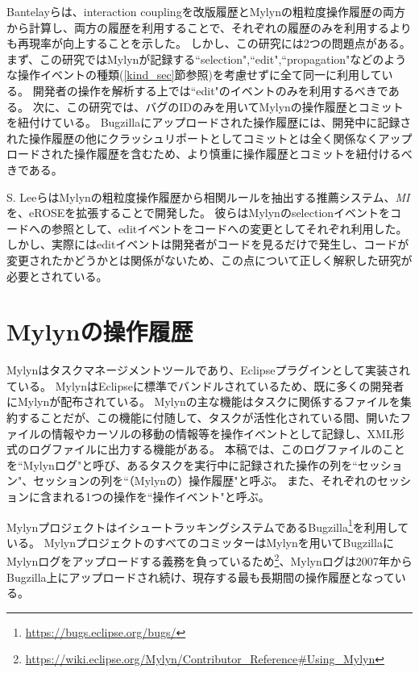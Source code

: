 \documentclass[a4paper]{jsbook}
\begin{document}
Bantelayら\cite{Bantelay:2013}は、interaction couplingを改版履歴とMylynの粗粒度操作履歴の両方から計算し、両方の履歴を利用することで、それぞれの履歴のみを利用するよりも再現率が向上することを示した。
しかし、この研究には2つの問題点がある。
まず、この研究ではMylynが記録する``selection",``edit",``propagation"などのような操作イベントの種類(\ref{kind_sec}節参照)を考慮せずに全て同一に利用している。
開発者の操作を解析する上では``edit"のイベントのみを利用するべきである。
次に、この研究では、バグのIDのみを用いてMylynの操作履歴とコミットを紐付けている。
Bugzillaにアップロードされた操作履歴には、開発中に記録された操作履歴の他にクラッシュリポートとしてコミットとは全く関係なくアップロードされた操作履歴を含むため、より慎重に操作履歴とコミットを紐付けるべきである。

S. Leeら\cite{SLee:2015}はMylynの粗粒度操作履歴から相関ルールを抽出する推薦システム、{\it MI}を、eROSE\cite{Zimmermann:2005}を拡張することで開発した。
彼らはMylynのselectionイベントをコードへの参照として、editイベントをコードへの変更としてそれぞれ利用した。
しかし、実際にはeditイベントは開発者がコードを見るだけで発生し、コードが変更されたかどうかとは関係がないため、この点について正しく解釈した研究が必要とされている。

\chapter{Mylynの操作履歴}\label{mylyn_chap}
Mylyn\cite{Kersten:2005}はタスクマネージメントツールであり、Eclipseプラグインとして実装されている。
MylynはEclipseに標準でバンドルされているため、既に多くの開発者にMylynが配布されている。
Mylynの主な機能はタスクに関係するファイルを集約することだが、この機能に付随して、タスクが活性化されている間、開いたファイルの情報やカーソルの移動の情報等を操作イベントとして記録し、XML形式のログファイルに出力する機能がある。
本稿では、このログファイルのことを``Mylynログ"と呼び、あるタスクを実行中に記録された操作の列を``セッション"、セッションの列を``（Mylynの）操作履歴"と呼ぶ。
また、それぞれのセッションに含まれる1つの操作を``操作イベント"と呼ぶ。

MylynプロジェクトはイシュートラッキングシステムであるBugzilla\footnote{\url{https://bugs.eclipse.org/bugs/}}を利用している。
MylynプロジェクトのすべてのコミッターはMylynを用いてBugzillaにMylynログをアップロードする義務を負っているため\footnote{\url{https://wiki.eclipse.org/Mylyn/Contributor_Reference\#Using_Mylyn}}、Mylynログは2007年からBugzilla上にアップロードされ続け、現存する最も長期間の操作履歴となっている。
\end{document}
